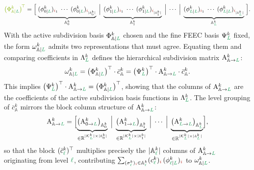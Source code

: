 \documentclass[a4paper, 12pt]{article}
\newcommand{\guidance}[1]{{\color{lime!70!black} #1}}
\newcommand{\green}{\color{ForestGreen}}
\newcommand{\brickred}{\color{BrickRed}}
\newcommand{\K}{\mathcal{K}}
\newcommand{\simplexname}{\sigma}
\newcommand{\simplex}[3]{\freeQ{\simplexname}{#1}{#2}{#3}}
\newcommand{\coarseIdxone}{{\brickred i}}
\renewcommand{\l}{{\green\ell}}
\renewcommand{\L}{{\green L}}
\newcommand{\constrQ}[5]{ ( {#1}^{#2}_{#3 \vert #4} )_{#5}} %
\newcommand{\constrVec}[4]{ {#1}^{#2}_{#3 \vert #4} }
\newcommand{\freeQ}[4]{ ( {#1}^{#2}_{#3} )_{#4}}
\newcommand{\freeVec}[3]{ {#1}^{#2}_{#3}}
\newcommand{\Amat}[3]{\mathbf{\mathrm{A}}^{#1}_{#2 \to #3}}
\newcommand{\FEECspace}[2]{\Lambda^{#1}_{#2}}
\newcommand{\FEECbases}{\Psi}
\newcommand{\SDFbasis}{\phi}
\newcommand{\SDFbases}{\Phi}
\newcommand{\activeDoFs}{\mathbb{A}}
\newcommand{\activeDoFSet}[2]{\activeDoFs^{#1}_{#2}}
\theoremstyle{definition}
\theoremstyle{plain}
\numberwithin{equation}{section}
\begin{document}
\begin{equation}
    \label{eq:hierarchical_basis_vector}
    \guidance{\big(\constrVec{\SDFbases}{k}{\activeDoFs}{\L}\big)^{\!\top}}
    = \Bigl[\;
        \underbrace{
            \constrQ{\SDFbasis}{k}{0}{\L}{\coarseIdxone_1}
            \;\cdots\;
            \constrQ{\SDFbasis}{k}{0}{\L}{\coarseIdxone_{|\activeDoFSet{k}{0}|}}
        }_{\activeDoFSet{k}{0}}
        \;\Big|\;
        \underbrace{
            \constrQ{\SDFbasis}{k}{1}{\L}{\coarseIdxone_1}
            \;\cdots\;
            \constrQ{\SDFbasis}{k}{1}{\L}{\coarseIdxone_{|\activeDoFSet{k}{1}|}}
        }_{\activeDoFSet{k}{1}}
        \;\Big|\;
        \cdots
        \;\Big|\;
        \underbrace{
            \constrQ{\SDFbasis}{k}{\L}{\L}{\coarseIdxone_1}
            \;\cdots\;
            \constrQ{\SDFbasis}{k}{\L}{\L}{\coarseIdxone_{|\activeDoFSet{k}{\L}|}}
        }_{\activeDoFSet{k}{\L}}
    \;\Bigr].
\end{equation}
With the active subdivision basis $\constrVec{\SDFbases}{k}{\activeDoFs}{\L}$ chosen and the fine FEEC basis $\freeVec{\FEECbases}{k}{\L}$ fixed, the form $\constrVec{\omega}{k}{\activeDoFs}{\L}$ admits two representations that must agree. Equating them and comparing coefficients in $\FEECspace{k}{\L}$ defines the hierarchical subdivision matrix $\Amat{k}{\activeDoFs}{\L}$:
\begin{equation}
    \label{eq:hierarchical_form_compact}
    \constrVec{\omega}{k}{\activeDoFs}{\L}
    = \big(\constrVec{\SDFbases}{k}{\activeDoFs}{\L}\big)^\top \cdot \freeVec{\bar{c}}{k}{\activeDoFs}
    = \big(\freeVec{\FEECbases}{k}{\L}\big)^\top \cdot \Amat{k}{\activeDoFs}{\L} \cdot \freeVec{\bar{c}}{k}{\activeDoFs}.
\end{equation}
This implies $\big(\freeVec{\FEECbases}{k}{\L}\big)^\top \cdot \Amat{k}{\activeDoFs}{\L} = \big(\constrVec{\SDFbases}{k}{\activeDoFs}{\L}\big)^\top$, showing that the columns of $\Amat{k}{\activeDoFs}{\L}$ are the coefficients of the active subdivision basis functions in $\FEECspace{k}{\L}$. The level grouping of $\freeVec{\bar{c}}{k}{\activeDoFs}$ mirrors the block column structure of $\Amat{k}{\activeDoFs}{\L}$:
\begin{equation}
    \label{eq:hierarchical_matrix_blocks}
    \Amat{k}{\activeDoFs}{\L}
    =
    \Bigl[
        \underbrace{\bigl(\Amat{k}{0}{\L}\bigr)_{\activeDoFSet{k}{0}}}_{\in \mathbb{R}^{|\K^k_\L| \times |\activeDoFSet{k}{0}|}}
        \;\Big|\;
        \underbrace{\bigl(\Amat{k}{1}{\L}\bigr)_{\activeDoFSet{k}{1}}}_{\in \mathbb{R}^{|\K^k_\L| \times |\activeDoFSet{k}{1}|}}
        \;\Big|\;
        \cdots
        \;\Big|\;
        \underbrace{\bigl(\Amat{k}{\L}{\L}\bigr)_{\activeDoFSet{k}{\L}}}_{\in \mathbb{R}^{|\K^k_\L| \times |\activeDoFSet{k}{\L}|}}
    \Bigr],
\end{equation}
so that the block $(\freeVec{\bar{c}}{k}{\l})^\top$ multiplies precisely the $|\activeDoFSet{k}{\l}|$ columns of $\Amat{k}{\activeDoFs}{\L}$ originating from level $\l$, contributing $\sum_{\simplex{k}{\l}{\coarseIdxone} \in \activeDoFSet{k}{\l}} \freeQ{c}{k}{\l}{\coarseIdxone} \, \constrQ{\SDFbasis}{k}{\l}{\L}{\coarseIdxone}$ to $\constrVec{\omega}{k}{\activeDoFs}{\L}$.
\end{document}
